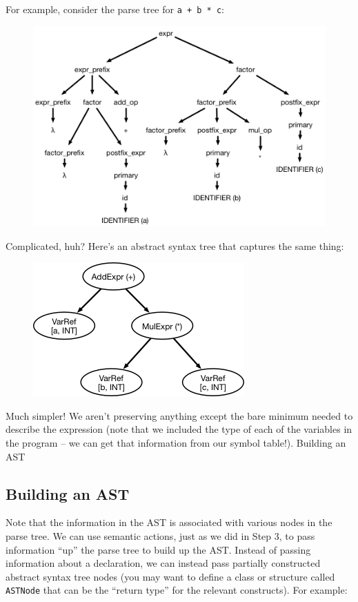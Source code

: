 \documentclass{article}
\begin{document}
For example, consider the parse tree for \texttt{a + b * c}:

\begin{figure}[H]
	\includegraphics[scale=0.5]{parsetree}
\end{figure}

Complicated, huh? Here's an abstract syntax tree that captures the same thing:

\begin{figure}[H]
	\includegraphics[scale=0.5]{ast}
\end{figure}

Much simpler! We aren't preserving anything except the bare minimum needed to describe the expression (note that we included the type of each of the variables in the program -- we can get that information from our symbol table!).
Building an AST

\subsection{Building an AST}
Note that the information in the AST is associated with various nodes in the parse tree. We can use semantic actions, just as we did in Step 3, to pass information ``up'' the parse tree to build up the AST. Instead of passing information about a declaration, we can instead pass partially constructed abstract syntax tree nodes (you may want to define a class or structure called \texttt{ASTNode} that can be the ``return type'' for the relevant constructs). For example:
\end{document}
